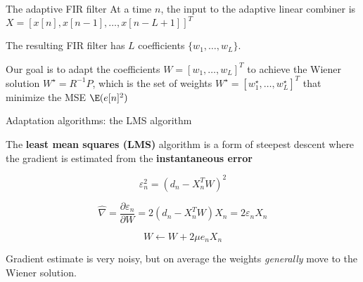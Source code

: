 \documentclass[10pt, aspectratio=169]{beamer}
\begin{document}
\begin{frame}{The adaptive FIR filter}
At a time $n$, the input to the adaptive linear combiner is $X = [x[n], x[n-1], \ldots, x[n-L+1]]^T$

\begin{center}
	\resizebox{0.8\textwidth}{!}{}
\end{center}

The resulting FIR filter has $L$ coefficients $\{w_1, \ldots, w_L\}$.

Our goal is to adapt the coefficients $W = [w_1, \ldots, w_L]^T$ to achieve the Wiener solution $W^\star = R^{-1}P$, which is the set of weights $W^\star = [w_1^\star, \ldots, w_L^\star]^T$ that minimize the MSE $\E(e[n]^2)$

\end{frame}

\begin{frame}{Adaptation algorithms: the LMS algorithm}

The \textbf{least mean squares (LMS)} algorithm is a form of steepest descent where the gradient is estimated from the \textbf{instantaneous error}

\begin{equation}
\varepsilon_n^2 = (d_n - X_n^TW)^2 \tag{instantaneous error}
\end{equation}

\begin{equation}
\hat{\nabla} = \frac{\partial \varepsilon_n}{\partial W} = 2(d_n - X_n^TW)X_n = 2\varepsilon_nX_n \tag{gradient estimate}
\end{equation}

\begin{equation*}
W \leftarrow W + 2\mu e_nX_n \tag{LMS weight update}
\end{equation*}

Gradient estimate is very noisy, but on average the weights \textit{generally} move to the Wiener solution.
\end{frame}
\end{document}
